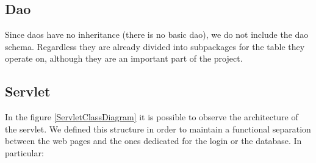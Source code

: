 \subsection*{Dao}

Since daos have no inheritance (there 
is no basic dao), we do not include the dao schema.
Regardless they are already divided into subpackages for the table they 
operate on, although they are an important part of the project.


\subsection*{Servlet}

In the figure \ref{ServletClassDiagram} it is possible to observe the 
architecture of the servlet. 
We defined this structure in order to maintain a functional separation 
between the web pages and the ones dedicated for the login or the database.
In particular: 
